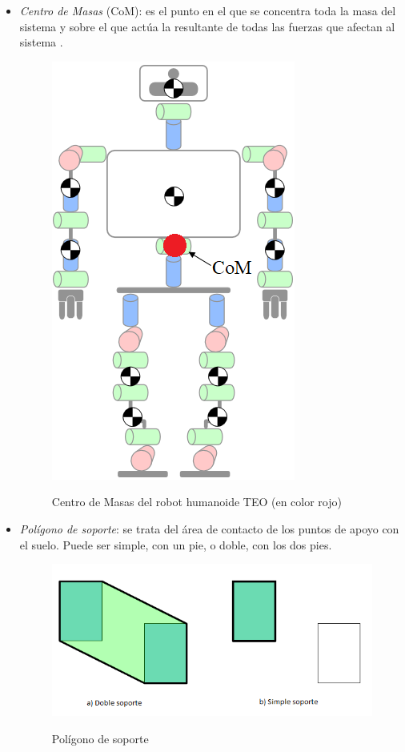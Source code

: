 \begin{itemize}
\item \emph{Centro de Masas} (CoM): es el punto en el que se concentra toda la masa del sistema y sobre el que actúa la resultante de todas las fuerzas que afectan al sistema \cite{ref9}.

\begin{figure}[H]
\centering
{\includegraphics[scale=0.5]{imagenes/apartado_2/215_center_of_mass}}
\caption{Centro de Masas del robot humanoide TEO (en color rojo)}
\label{figura215}
\end{figure}

\item \emph{Polígono de soporte}: se trata del área de contacto de los puntos de apoyo con el suelo. Puede ser simple, con un pie, o doble, con los dos pies.

\begin{figure}[H]
\centering
{\includegraphics[scale=0.6]{imagenes/apartado_2/216_supportpolygon}}
\caption{Polígono de soporte}
\label{figura216}
\end{figure}


\end{itemize}
